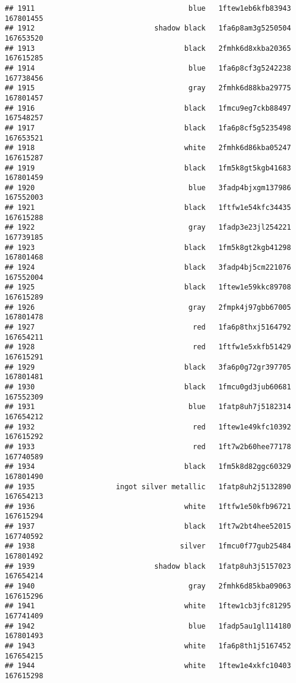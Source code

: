 \documentclass[
]{article}
\begin{document}
\begin{verbatim}
## 1911                                    blue   1ftew1eb6kfb83943 167801455
## 1912                            shadow black   1fa6p8am3g5250504 167653520
## 1913                                   black   2fmhk6d8xkba20365 167615285
## 1914                                    blue   1fa6p8cf3g5242238 167738456
## 1915                                    gray   2fmhk6d88kba29775 167801457
## 1916                                   black   1fmcu9eg7ckb88497 167548257
## 1917                                   black   1fa6p8cf5g5235498 167653521
## 1918                                   white   2fmhk6d86kba05247 167615287
## 1919                                   black   1fm5k8gt5kgb41683 167801459
## 1920                                    blue   3fadp4bjxgm137986 167552003
## 1921                                   black   1ftfw1e54kfc34435 167615288
## 1922                                    gray   1fadp3e23jl254221 167739185
## 1923                                   black   1fm5k8gt2kgb41298 167801468
## 1924                                   black   3fadp4bj5cm221076 167552004
## 1925                                   black   1ftew1e59kkc89708 167615289
## 1926                                    gray   2fmpk4j97gbb67005 167801478
## 1927                                     red   1fa6p8thxj5164792 167654211
## 1928                                     red   1ftfw1e5xkfb51429 167615291
## 1929                                   black   3fa6p0g72gr397705 167801481
## 1930                                   black   1fmcu0gd3jub60681 167552309
## 1931                                    blue   1fatp8uh7j5182314 167654212
## 1932                                     red   1ftew1e49kfc10392 167615292
## 1933                                     red   1ft7w2b60hee77178 167740589
## 1934                                   black   1fm5k8d82ggc60329 167801490
## 1935                   ingot silver metallic   1fatp8uh2j5132890 167654213
## 1936                                   white   1ftfw1e50kfb96721 167615294
## 1937                                   black   1ft7w2bt4hee52015 167740592
## 1938                                  silver   1fmcu0f77gub25484 167801492
## 1939                            shadow black   1fatp8uh3j5157023 167654214
## 1940                                    gray   2fmhk6d85kba09063 167615296
## 1941                                   white   1ftew1cb3jfc81295 167741409
## 1942                                    blue   1fadp5au1gl114180 167801493
## 1943                                   white   1fa6p8th1j5167452 167654215
## 1944                                   white   1ftew1e4xkfc10403 167615298

\end{verbatim}
\end{document}
